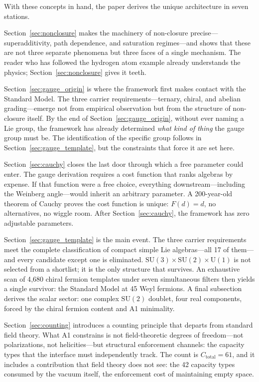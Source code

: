 \documentclass[11pt]{article}
\newcommand{\SU}{\mathrm{SU}}
\newcommand{\U}{\mathrm{U}}
\begin{document}
With these concepts in hand, the paper derives the unique architecture in seven stations.

Section~\ref{sec:nonclosure} makes the machinery of non-closure precise---superadditivity, path dependence, and saturation regimes---and shows that these are not three separate phenomena but three faces of a single mechanism.  The reader who has followed the hydrogen atom example already understands the physics; Section~\ref{sec:nonclosure} gives it teeth.

Section~\ref{sec:gauge_origin} is where the framework first makes contact with the Standard Model.  The three carrier requirements---ternary, chiral, and abelian grading---emerge not from empirical observation but from the structure of non-closure itself.  By the end of Section~\ref{sec:gauge_origin}, without ever naming a Lie group, the framework has already determined \emph{what kind of thing} the gauge group must be.  The identification of the specific group follows in Section~\ref{sec:gauge_template}, but the constraints that force it are set here.

Section~\ref{sec:cauchy} closes the last door through which a free parameter could enter.  The gauge derivation requires a cost function that ranks algebras by expense.  If that function were a free choice, everything downstream---including the Weinberg angle---would inherit an arbitrary parameter.  A 200-year-old theorem of Cauchy proves the cost function is unique: $F(d) = d$, no alternatives, no wiggle room.  After Section~\ref{sec:cauchy}, the framework has zero adjustable parameters.

Section~\ref{sec:gauge_template} is the main event.  The three carrier requirements meet the complete classification of compact simple Lie algebras---all 17 of them---and every candidate except one is eliminated.  $\SU(3) \times \SU(2) \times \U(1)$ is not selected from a shortlist; it is the only structure that survives.  An exhaustive scan of 4{,}680 chiral fermion templates under seven simultaneous filters then yields a single survivor: the Standard Model at 45 Weyl fermions.  A final subsection derives the scalar sector: one complex $\SU(2)$ doublet, four real components, forced by the chiral fermion content and A1 minimality.

Section~\ref{sec:counting} introduces a counting principle that departs from standard field theory.  What A1 constrains is not field-theoretic degrees of freedom---not polarizations, not helicities---but structural enforcement channels: the capacity types that the interface must independently track.  The count is $C_{\mathrm{total}} = 61$, and it includes a contribution that field theory does not see: the 42 capacity types consumed by the vacuum itself, the enforcement cost of maintaining empty space.
\end{document}
